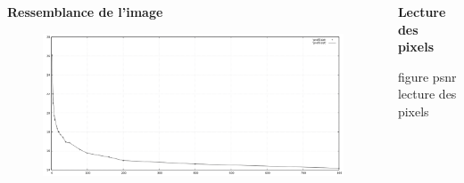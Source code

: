 \documentclass{beamer}
\begin{document}
\begin{frame}[t]

        \begin{columns}[t]


            \begin{column}{.5\linewidth}
                \begin{block}{\centering \textbf{Ressemblance de l'image}}


                    \begin{center}
                        \begin{figure}[t]
                            \includegraphics[width=.6\linewidth]{rsc/psnr_ressemblance.png}
                        \end{figure}
                    \end{center}
                \end{block}
            \end{column}


            \begin{column}{.5\linewidth}
                \begin{block}{\centering \textbf{Lecture des pixels}}


                    \begin{center}
                        figure psnr lecture des pixels
                    \end{center}
                \end{block}
            \end{column}
        \end{columns}
    \end{frame}
\end{document}

